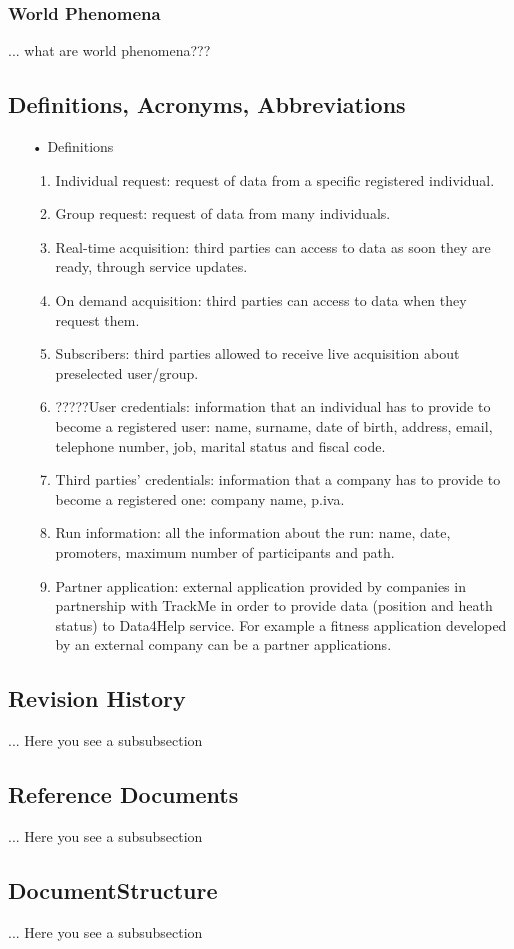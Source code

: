 \subsubsection{World Phenomena}
... what are world phenomena???

\subsection{Definitions, Acronyms, Abbreviations}

\begin{enumerate}
\item[•] {\Large Definitions}
	\begin{enumerate}
		\item Individual request: request of data from a specific registered individual.
		\item Group request: request of data from many individuals. 
		\item Real-time acquisition: third parties can access to data as soon they are ready, 				through service updates.
		\item On demand acquisition: third parties can access to data when they request 				them.
		\item Subscribers: third parties allowed to receive live acquisition about 						preselected	user/group.
		\item ?????User credentials: information that an individual has to provide to become a 				registered user: name, surname, date of birth, address, email, telephone
			number, job, marital status and fiscal code. 
		\item Third parties' credentials: information that a company has to provide to 					become a registered one: company name, p.iva.
		\item Run information: all the information about the run: name, date, promoters, 				maximum number of participants and path.
		\item Partner application: external application provided by companies in partnership with TrackMe in order to provide data (position and heath status) to Data4Help service. For example a fitness application developed by an external company can be a partner applications.
	\end{enumerate}
\end{enumerate}
	
\subsection{Revision History}
... Here you see a subsubsection
\subsection{Reference Documents}
... Here you see a subsubsection
\subsection{DocumentStructure}
... Here you see a subsubsection

